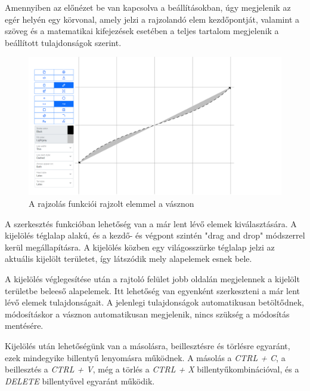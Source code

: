 Amennyiben az előnézet be van kapcsolva a beállításokban, úgy megjelenik az egér helyén egy körvonal, amely jelzi a rajzolandó elem kezdőpontját, valamint a szöveg és a matematikai kifejezések esetében a teljes tartalom megjelenik a beállított tulajdonságok szerint.

\begin{figure}[!h]
	\label{fig:draw}
	\includegraphics[width=\textwidth]{images/editor_draw.png}
	\caption{A rajzolás funkciói rajzolt elemmel a vásznon}
\end{figure}


A szerkesztés funkcióban lehetőség van a már lent lévő elemek kiválasztására. A kijelölés téglalap alakú, és a kezdő- és végpont szintén "drag and drop" módszerrel kerül megállapításra. A kijelölés közben egy világosszürke téglalap jelzi az aktuális kijelölt területet, így látszódik mely alapelemek esnek bele.

A kijelölés véglegesítése után a rajtoló felület jobb oldalán megjelennek a kijelölt területbe beleeső alapelemek. Itt lehetőség van egyenként szerkeszteni a már lent lévő elemek tulajdonságait. A jelenlegi tulajdonságok automatikusan betöltődnek, módosításkor a vásznon automatikusan megjelenik, nincs szükség a módosítás mentésére.

Kijelölés után lehetőségünk van a másolásra, beillesztésre és törlésre egyaránt, ezek mindegyike billentyű lenyomásra működnek. A másolás a  \textit{CTRL + C}, a beillesztés a \textit{CTRL + V}, még a törlés a \textit{CTRL + X} billentyűkombinációval, és a \textit{DELETE} billentyűvel egyaránt működik.

